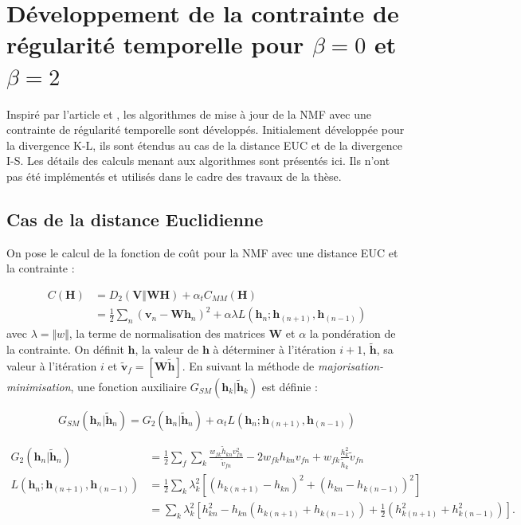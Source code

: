 \chapter{Développement de la contrainte de régularité temporelle pour $\beta = 0$ et $\beta = 2$}\label{annex:smoothNMF}

Inspiré par l'article \cite{essid2013smooth} et \cite{fevotte_algorithms_2011}, les algorithmes de mise à jour de la NMF avec une contrainte de régularité temporelle sont développés. Initialement développée pour la divergence K-L, ils sont étendus au cas de la distance EUC et de la divergence I-S. Les détails des calculs menant aux algorithmes sont présentés ici. Ils n'ont pas été implémentés et utilisés dans le cadre des travaux de la thèse.

\section{Cas de la distance Euclidienne}
On pose le calcul de la fonction de coût pour la NMF avec une distance EUC et la contrainte :

\begin{align}
C(\mathbf{H}) &= D_2(\mathbf{V} \Vert \mathbf{WH}) + \alpha_t C_{MM}(\mathbf{H})\\
 &= \frac{1}{2}\sum_n(\mathbf{v}_n-\mathbf{Wh}_n)^2+\alpha\lambda L(\mathbf{h}_{n}; \mathbf{h}_{(n+1)}, \mathbf{h}_{(n-1)}) 
\end{align}
avec $\lambda = \Vert w \Vert$, la terme de normalisation des matrices $\mathbf{W}$ et $\alpha$ la pondération de la contrainte. On définit $\mathbf{h}$, la valeur de $\mathbf{h}$ à déterminer à l'itération $i+1$, $\mathbf{\tilde{h}}$, sa valeur à l'itération $i$ et $\mathbf{\tilde{v}}_f = \left[\mathbf{W}\tilde{\textbf{h}}\right]$.
En suivant la méthode de \textit{majorisation-minimisation}, une fonction auxiliaire $G_{SM}(\mathbf{h}_{k}\vert \mathbf{\tilde{h}}_{k})$ est définie : 

\begin{equation}
G_{SM}(\mathbf{h}_{n}\vert \mathbf{\tilde{h}}_{n}) = G_{2}(\mathbf{h}_{n}\vert \mathbf{\tilde{h}}_{n})+\alpha_t L(\mathbf{h}_{n}; \mathbf{h}_{(n+1)}, \mathbf{h}_{(n-1)})
\end{equation}


\begin{align}
G_{2}(\mathbf{h}_{n}\vert \mathbf{\tilde{h}}_{n}) &= \frac{1}{2}\sum_{f} \sum_k \frac{w_{fk} \tilde{h}_{kn} v_{fn}^2}{\tilde{v}_{fn}}-2 w_{fk} h_{kn} v_{fn}+w_{fk}\frac{h_{k}^2}{\tilde{h}_{k}}\tilde{v}_{fn}
\\
L(\mathbf{h}_{n}; \mathbf{h}_{(n+1)}, \mathbf{h}_{(n-1)}) &= \frac{1}{2}\sum_{k}\lambda_k^2 \left[ \left(h_{k(n+1)}-h_{kn}\right)^2+\left(h_{kn}-h_{k(n-1)}\right)^2 \right]\\
&= \sum_k \lambda_k^2 \left[ h_{kn}^2- h_{kn}\left(h_{k(n+1)}+h_{k(n-1)}\right)+\frac{1}{2} \left(h_{k(n+1)}^2+h_{k(n-1)}^2\right) \right].
\end{align}
 
